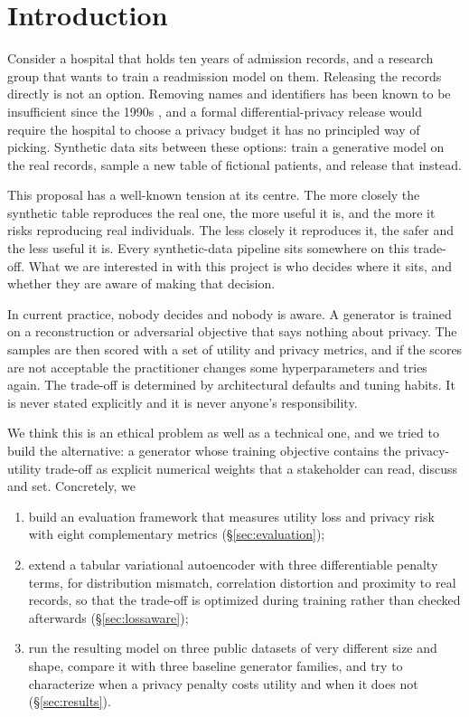 \documentclass[11pt,a4paper]{article}
\begin{document}
\section{Introduction}

Consider a hospital that holds ten years of admission records, and a research
group that wants to train a readmission model on them. Releasing the records
directly is not an option. Removing names and identifiers has been known to be
insufficient since the 1990s \citep{sweeney2002}, and a formal
differential-privacy release would require the hospital to choose a privacy
budget it has no principled way of picking. Synthetic data sits between these
options: train a generative model on the real records, sample a new table of
fictional patients, and release that instead.

This proposal has a well-known tension at its centre. The more closely the
synthetic table reproduces the real one, the more useful it is, and the more
it risks reproducing real individuals. The less closely it reproduces it, the
safer and the less useful it is. Every synthetic-data pipeline sits somewhere
on this trade-off. What we are interested in with this project is who decides
where it sits, and whether they are aware of making that decision.

In current practice, nobody decides and nobody is aware. A generator is
trained on a reconstruction or adversarial objective that says nothing about
privacy. The samples are then scored with a set of utility and privacy metrics,
and if the scores are not acceptable the practitioner changes some
hyperparameters and tries again. The trade-off is determined by architectural
defaults and tuning habits. It is never stated explicitly and it is never
anyone's responsibility.

We think this is an ethical problem as well as a technical one, and we tried to
build the alternative: a generator whose training objective contains the
privacy-utility trade-off as explicit numerical weights that a stakeholder can
read, discuss and set. Concretely, we
\begin{enumerate}[nosep]
  \item build an evaluation framework that measures utility loss and privacy
        risk with eight complementary metrics (\S\ref{sec:evaluation});
  \item extend a tabular variational autoencoder with three differentiable
        penalty terms, for distribution mismatch, correlation distortion and
        proximity to real records, so that the trade-off is optimized during
        training rather than checked afterwards (\S\ref{sec:lossaware});
  \item run the resulting model on three public datasets of very different
        size and shape, compare it with three baseline generator families,
        and try to characterize when a privacy penalty costs utility
        and when it does not (\S\ref{sec:results}).
\end{enumerate}
\end{document}
